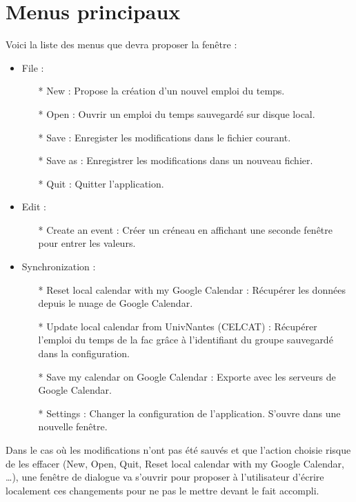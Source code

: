     \section{Menus principaux}
        Voici la liste des menus que devra proposer la fenêtre :
        \begin{itemize}
            \item File :
                \begin{itemize}
                    \item[*] New : Propose la création d'un nouvel emploi du temps.
                    \item[*] Open : Ouvrir un emploi du temps sauvegardé sur disque local.
                    \item[*] Save : Enregister les modifications dans le fichier courant.
                    \item[*] Save as : Enregistrer les modifications dans un nouveau fichier. 
                    \item[*] Quit : Quitter l'application.
                \end{itemize}
            \item Edit :
                \begin{itemize}
                    \item[*] Create an event : Créer un créneau en affichant une seconde fenêtre pour entrer les valeurs.
                \end{itemize}
            \item Synchronization :
                \begin{itemize}
                    \item[*] Reset local calendar with my Google Calendar : Récupérer les données depuis le nuage de Google Calendar.
                    \item[*] Update local calendar from UnivNantes (CELCAT) : Récupérer l'emploi du temps de la fac grâce à l'identifiant du groupe sauvegardé dans la configuration.
                    \item[*] Save my calendar on Google Calendar : Exporte avec les serveurs de Google Calendar.
                    \item[*] Settings : Changer la configuration de l'application. S'ouvre dans une nouvelle fenêtre.
                \end{itemize}
        \end{itemize}
        
        Dans le cas où les modifications n'ont pas été sauvés et que l'action choisie risque de les effacer (New, Open, Quit, Reset local calendar with my Google Calendar, \dots), une fenêtre de dialogue va s'ouvrir pour proposer à l'utilisateur d'écrire localement ces changements pour ne pas le mettre devant le fait accompli.
        


